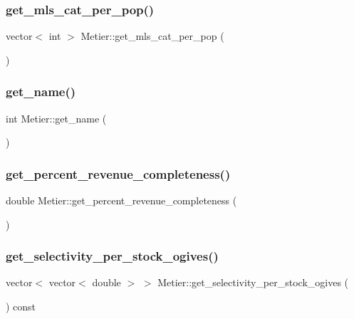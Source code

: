\subsubsection{\texorpdfstring{get\_mls\_cat\_per\_pop()}{get\_mls\_cat\_per\_pop()}}
{\footnotesize\ttfamily vector$<$ int $>$ Metier\+::get\+\_\+mls\+\_\+cat\+\_\+per\+\_\+pop (\begin{DoxyParamCaption}{ }\end{DoxyParamCaption})}

\mbox{\label{class_metier_af52f1bba643a43ddb189227489338218}} 
\subsubsection{\texorpdfstring{get\_name()}{get\_name()}}
{\footnotesize\ttfamily int Metier\+::get\+\_\+name (\begin{DoxyParamCaption}{ }\end{DoxyParamCaption})}

\mbox{\label{class_metier_a1aafee0c10408e1d451f41033da884bb}} 
\subsubsection{\texorpdfstring{get\_percent\_revenue\_completeness()}{get\_percent\_revenue\_completeness()}}
{\footnotesize\ttfamily double Metier\+::get\+\_\+percent\+\_\+revenue\+\_\+completeness (\begin{DoxyParamCaption}{ }\end{DoxyParamCaption})}

\mbox{\label{class_metier_ae86e6f7f4dae4b20600b305071381ccc}} 
\subsubsection{\texorpdfstring{get\_selectivity\_per\_stock\_ogives()}{get\_selectivity\_per\_stock\_ogives()}}
{\footnotesize\ttfamily vector$<$ vector$<$ double $>$ $>$ Metier\+::get\+\_\+selectivity\+\_\+per\+\_\+stock\+\_\+ogives (\begin{DoxyParamCaption}{ }\end{DoxyParamCaption}) const}

